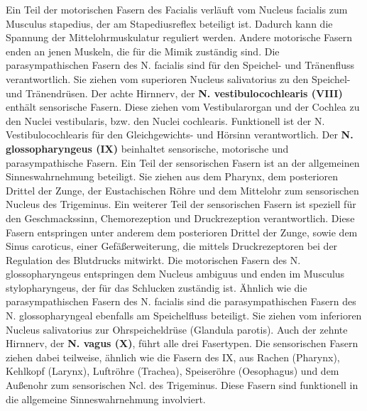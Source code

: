 \documentclass[12pt,a4paper,pdftex]{article}
\begin{document}
Ein Teil der motorischen Fasern des Facialis verläuft vom Nucleus facialis zum Musculus stapedius, der am Stapediusreflex beteiligt ist. Dadurch kann die Spannung der Mittelohrmuskulatur reguliert werden. Andere motorische Fasern enden an jenen Muskeln, die für die Mimik zuständig sind.  Die parasympathischen Fasern des N. facialis sind für den Speichel- und Tränenfluss verantwortlich. Sie ziehen vom superioren Nucleus salivatorius zu den Speichel- und Tränendrüsen. Der achte Hirnnerv, der \textbf{N. vestibulocochlearis (VIII)} enthält sensorische Fasern. Diese ziehen vom Vestibularorgan und der Cochlea zu den Nuclei vestibularis, bzw. den Nuclei cochlearis. Funktionell ist der N. Vestibulocochlearis für den Gleichgewichts- und Hörsinn verantwortlich. Der \textbf{N. glossopharyngeus (IX)} beinhaltet sensorische, motorische und parasympathische Fasern. Ein Teil der sensorischen Fasern ist an der allgemeinen Sinneswahrnehmung beteiligt. Sie ziehen aus dem Pharynx, dem posterioren Drittel der Zunge, der Eustachischen Röhre und dem Mittelohr zum sensorischen Nucleus des Trigeminus. Ein weiterer Teil der sensorischen Fasern ist speziell für den Geschmackssinn, Chemorezeption und Druckrezeption verantwortlich. Diese Fasern entspringen unter anderem dem posterioren Drittel der Zunge, sowie dem Sinus caroticus, einer Gefäßerweiterung, die mittels Druckrezeptoren bei der Regulation des Blutdrucks mitwirkt. Die motorischen Fasern des N. glossopharyngeus entspringen dem Nucleus ambiguus und enden im Musculus stylopharyngeus, der für das Schlucken zuständig ist. Ähnlich wie die parasympathischen Fasern des N. facialis sind die parasympathischen Fasern des N. glossopharyngeal ebenfalls am Speichelfluss beteiligt. Sie ziehen vom inferioren Nucleus salivatorius zur Ohrspeicheldrüse (Glandula parotis). Auch der zehnte Hirnnerv, der \textbf{N. vagus (X)}, führt alle drei Fasertypen. Die sensorischen Fasern ziehen dabei teilweise, ähnlich wie die Fasern des IX, aus Rachen (Pharynx), Kehlkopf (Larynx), Luftröhre (Trachea), Speiseröhre (Oesophagus) und dem Außenohr zum sensorischen Ncl. des Trigeminus. Diese Fasern sind funktionell in die allgemeine Sinneswahrnehmung involviert. 
\end{document}
